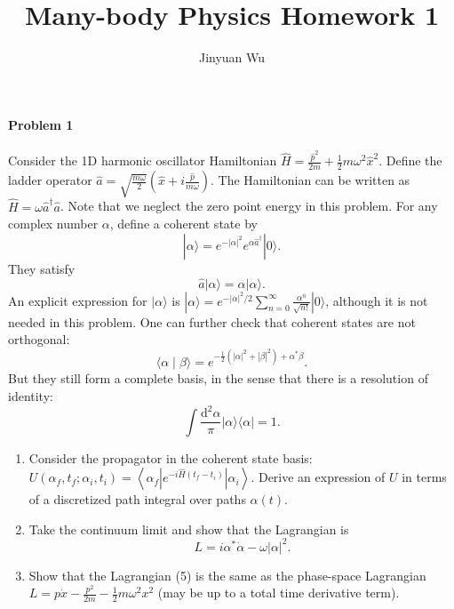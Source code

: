 \documentclass[hyperref, a4paper]{article}
\title{Many-body Physics Homework 1}
\author{Jinyuan Wu}
\begin{document}
\maketitle

\paragraph{Problem 1} Consider the 1D harmonic oscillator Hamiltonian $\hat{H}=\frac{\hat{p}^2}{2 m}+\frac{1}{2} m \omega^2 \hat{x}^2$. Define the ladder operator $\hat{a}=\sqrt{\frac{m \omega}{2}}\left(\hat{x}+i \frac{\hat{p}}{m \omega}\right)$. The Hamiltonian can be written as $\hat{H}=\omega \hat{a}^{\dagger} \hat{a}$. Note that we neglect the zero point energy in this problem. For any complex number $\alpha$, define a coherent state by
$$
|\alpha\rangle=e^{-|\alpha|^2} e^{\alpha \hat{a}^{\dagger}}|0\rangle .
$$
They satisfy
$$
\hat{a}|\alpha\rangle=\alpha|\alpha\rangle .
$$
An explicit expression for $|\alpha\rangle$ is $|\alpha\rangle=e^{-|\alpha|^2 / 2} \sum_{n=0}^{\infty} \frac{\alpha^n}{\sqrt{n !}}|0\rangle$, although it is not needed in this problem. One can further check that coherent states are not orthogonal:
$$
\langle\alpha \mid \beta\rangle=e^{-\frac{1}{2}\left(|\alpha|^2+|\beta|^2\right)+\alpha^* \beta} .
$$
But they still form a complete basis, in the sense that there is a resolution of identity:
$$
\int \frac{\mathrm{d}^2 \alpha}{\pi}|\alpha\rangle\langle\alpha|=1 .
$$
\begin{enumerate}
    \item Consider the propagator in the coherent state basis: $U\left(\alpha_f, t_f ; \alpha_i, t_i\right)=\left\langle\alpha_f\left|e^{-i \hat{H}\left(t_f-t_i\right)}\right| \alpha_i\right\rangle$. Derive an expression of $U$ in terms of a discretized path integral over paths $\alpha(t)$.
    \item Take the continuum limit and show that the Lagrangian is
    $$
    L=i \alpha^* \dot{\alpha}-\omega|\alpha|^2 .
    $$
    \item Show that the Lagrangian (5) is the same as the phase-space Lagrangian $L=p \dot{x}-\frac{p^2}{2 m}-\frac{1}{2} m \omega^2 x^2$ (may be up to a total time derivative term).
\end{enumerate}
\end{document}
